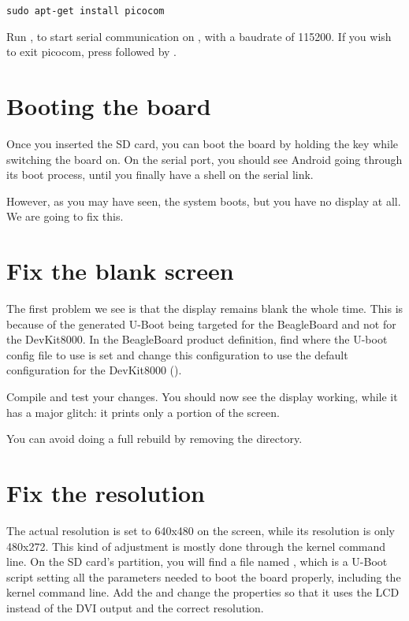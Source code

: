 \begin{verbatim}
sudo apt-get install picocom
\end{verbatim}

Run , to start serial
communication on , with a baudrate of 115200. If
you wish to exit picocom, press \code{[Ctrl][a]} followed by
\code{[Ctrl][x]}.

\section{Booting the board}

Once you inserted the SD card, you can boot the board by holding the
 key while switching the board on. On the serial port, you
should see Android going through its boot process, until you finally
have a shell on the serial link.

However, as you may have seen, the system boots, but you have no
display at all. We are going to fix this.

\section{Fix the blank screen}

The first problem we see is that the display remains blank the whole
time. This is because of the generated U-Boot being targeted for the
BeagleBoard and not for the DevKit8000. In the BeagleBoard product
definition, find where the U-boot config file to use is set and change
this configuration to use the default configuration for the DevKit8000
().

Compile and test your changes. You should now see the display working,
while it has a major glitch: it prints only a portion of the screen.

You can avoid doing a full rebuild by removing the
 directory.

\section{Fix the resolution}

The actual resolution is set to 640x480 on the screen, while its
resolution is only 480x272. This kind of adjustment is mostly done
through the kernel command line. On the SD card's 
partition, you will find a file named , which is a
U-Boot script setting all the parameters needed to boot the board
properly, including the kernel command line. Add the
 and change the  properties
so that it uses the LCD instead of the DVI output and the correct
resolution.

